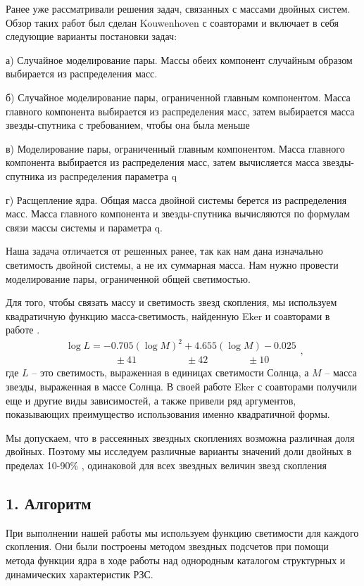 \documentclass[a4paper,12pt]{article}
\begin{document}
Ранее уже рассматривали решения задач, связанных с массами двойных систем. Обзор таких работ был сделан Kouwenhoven \cite{Kouwenhoven} с соавторами и включает в себя следующие варианты постановки задач:

а)	Случайное моделирование пары. Массы обеих компонент случайным образом выбирается из распределения масс. 

б)	Случайное моделирование пары, ограниченной главным компонентом. Масса главного компонента выбирается из распределения масс, затем выбирается масса звезды-спутника с требованием, чтобы она была меньше

в)	Моделирование пары, ограниченный главным компонентом. Масса главного компонента выбирается из распределения масс, затем вычисляется масса звезды-спутника из распределения параметра q
 
г)	Расщепление ядра. Общая масса двойной системы берется из распределения масс. Масса главного компонента и звезды-спутника вычисляются по формулам связи массы системы и параметра q.

Наша задача отличается от решенных ранее, так как нам дана изначально светимость двойной системы, а не их суммарная масса. Нам нужно провести моделирование пары, ограниченной общей светимостью.

Для того, чтобы связать массу и светимость звезд скопления, мы используем квадратичную функцию масса-светимость, найденную Eker и соавторами в работе \cite{Eker}.
\begin{equation}
\begin{array}{l}
\log{L} = -0.705 (\log{M})^2  + 4.655 (\log {M}) - 0.025\\
 \qquad \qquad \quad \pm 41 \qquad \qquad \quad \pm42 \qquad \quad  \quad \pm10
\label{EkersEq}
\end{array},
\end{equation}
 где $L$ -- это светимость, выраженная в единицах светимости Солнца, а $M$  -- масса звезды, выраженная в массе Солнца.
 В своей работе Eker \cite{Eker} с соавторами получили еще и другие виды зависимостей, а также привели ряд аргументов, показывающих преимущество использования именно квадратичной формы.
 
 Мы допускаем, что в рассеянных звездных скоплениях возможна различная доля двойных. Поэтому мы исследуем различные варианты значений доли двойных в пределах 10-90\% , одинаковой для всех звездных величин звезд скопления
\subsection{1. Алгоритм}
При выполнении нашей работы мы используем функцию светимости для каждого скопления. Они были построены методом звездных подсчетов при помощи метода функции ядра в ходе работы над однородным каталогом структурных и динамических характеристик РЗС.%
\end{document}
